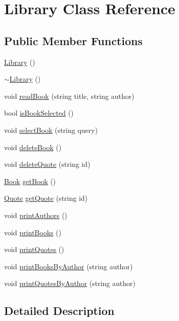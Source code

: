 \hypertarget{class_library}{}\section{Library Class Reference}
\label{class_library}
\subsection*{Public Member Functions}
\begin{DoxyCompactItemize}
\item 
\hyperlink{class_library_a82338219d8bf51962ff5f60a0db21b19}{Library} ()
\item 
\hyperlink{class_library_a62120f28a9b50cc5b151d868e42ab936}{$\sim$\+Library} ()
\item 
void \hyperlink{class_library_ab6fb1208e63af938df64fa831cbacb40}{read\+Book} (string title, string author)
\item 
bool \hyperlink{class_library_a04ff0757054c2813e89036cdd3f7f91f}{is\+Book\+Selected} ()
\item 
void \hyperlink{class_library_a6dd541a183a89a4d35a80834ed9d8d71}{select\+Book} (string query)
\item 
void \hyperlink{class_library_a0248e22f1ba1611d3b3c8b7843a6d8b9}{delete\+Book} ()
\item 
void \hyperlink{class_library_a705ee20f1edab1ebf274c9e2cbb4d7a3}{delete\+Quote} (string id)
\item 
\hyperlink{class_book}{Book} \hyperlink{class_library_a67ccad51c76c3abfb0d46fa533f46e03}{get\+Book} ()
\item 
\hyperlink{class_quote}{Quote} \hyperlink{class_library_aba57d7dcf92c9da4c3d8a359ceba7e2b}{get\+Quote} (string id)
\item 
void \hyperlink{class_library_aba2ed0b3b1ee81565ca5b62f2ac5c924}{print\+Authors} ()
\item 
void \hyperlink{class_library_a35220a3b5a4a6d9059cc4fc18ae4c0c3}{print\+Books} ()
\item 
void \hyperlink{class_library_a819acb04f4b8aea0547db50918b1c5fa}{print\+Quotes} ()
\item 
void \hyperlink{class_library_a6e22621933979ff5cb4e95de3f54b72c}{print\+Books\+By\+Author} (string author)
\item 
void \hyperlink{class_library_aa13544bfe57c61164d9953518e88dcb0}{print\+Quotes\+By\+Author} (string author)
\end{DoxyCompactItemize}


\subsection{Detailed Description}


